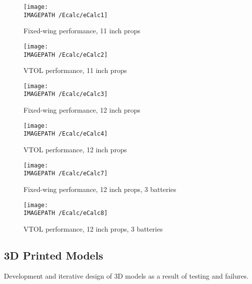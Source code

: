 \begin{figure}[H]
	\centering
	\texttt{[image: \\IMAGEPATH /Ecalc/eCalc1]}
	\caption{Fixed-wing performance, 11 inch props}
\end{figure}
\begin{figure}[H]
	\centering
	\texttt{[image: \\IMAGEPATH /Ecalc/eCalc2]}
	\caption{VTOL performance, 11 inch props}
\end{figure}
\begin{figure}[H]
	\centering
	\texttt{[image: \\IMAGEPATH /Ecalc/eCalc3]}
	\caption{Fixed-wing performance, 12 inch props}
	\label{fig:fixed}
\end{figure}
\begin{figure}[H]
	\centering
	\texttt{[image: \\IMAGEPATH /Ecalc/eCalc4]}
	\caption{VTOL performance, 12 inch props}
	\label{fig:vtol}
\end{figure}
\begin{figure}[H]
	\centering
	\texttt{[image: \\IMAGEPATH /Ecalc/eCalc7]}
	\caption{Fixed-wing performance, 12 inch props, 3 batteries}
\end{figure}
\begin{figure}[H]
	\centering
	\texttt{[image: \\IMAGEPATH /Ecalc/eCalc8]}
	\caption{VTOL performance, 12 inch props, 3 batteries}
\end{figure}

\newpage

\subsection{3D Printed Models}
\label{sec:print}
Development and iterative design of 3D models as a result of testing and failures.\\

